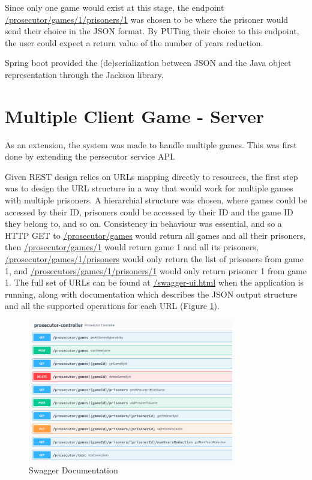 \documentclass[12pt]{article}
\begin{document}
Since only one game would exist at this stage, the endpoint \url{/prosecutor/games/1/prisoners/1} was chosen to be where the prisoner would send their choice in the JSON format. By PUTing their choice to this endpoint, the user could expect a return value of the number of years reduction. 
 		
Spring boot provided the (de)serialization between JSON and the Java object representation through the Jackson library. 

\part{Multiple Client Game - Server}

As an extension, the system was made to handle multiple games. This was first done by extending the persecutor service API.

Given REST design relies on URLs mapping directly to resources, the first step was to design the URL structure in a way that would work for multiple games with multiple prisoners. A hierarchial structure was chosen, where games could be accessed by their ID, prisoners could be accessed by their ID and the game ID they belong to, and so on. Consistency in behaviour was essential, and so a HTTP GET to \url{/prosecutor/games} would return all games and all their prisoners, then \url{/prosecutor/games/1} would return game 1 and all its prisoners, \url{/prosecutor/games/1/prisoners} would only return the list of prisoners from game 1, and \url{/prosecutors/games/1/prisoners/1} would only return prisoner 1 from game 1. The full set of URLs can be found at \url{/swagger-ui.html} when the application is running, along with documentation which describes the JSON output structure and all the supported operations for each URL (Figure \ref{fig:swagger}). 

\begin{figure}[!ht]
        \centering
        \includegraphics[width=0.8\textwidth]{images/swagger}
        \caption{Swagger Documentation}
        \label{fig:swagger}
\end{figure}
\end{document}
